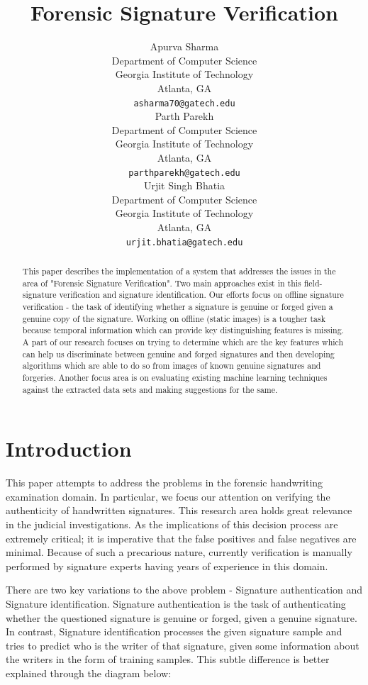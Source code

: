 \documentclass{article}
\title{Forensic Signature Verification}
\author{
Apurva Sharma\\
Department of Computer Science\\
Georgia Institute of Technology\\
Atlanta, GA\\
\texttt{asharma70@gatech.edu} \\
\And
Parth Parekh\\
Department of Computer Science\\
Georgia Institute of Technology\\
Atlanta, GA\\
\texttt{parthparekh@gatech.edu} \\
\And
Urjit Singh Bhatia\\
Department of Computer Science\\
Georgia Institute of Technology\\
Atlanta, GA\\
\texttt{urjit.bhatia@gatech.edu} \\
}
\begin{document}
\maketitle

\begin{abstract}
This paper describes the implementation of a system that addresses the issues in the area of "Forensic Signature Verification". Two main approaches exist in this field- signature verification and signature identification. Our efforts focus on offline signature verification - the task of identifying whether a signature is genuine or forged given a genuine copy of the signature. Working on offline (static images) is a tougher task because temporal information which can provide key distinguishing features is missing. A part of our research focuses on trying to determine which are the key features which can help us discriminate between genuine and forged signatures and then developing algorithms which are able to do so from images of known genuine signatures and forgeries. Another focus area is on evaluating existing machine learning techniques against the extracted data sets and making suggestions for the same.

\end{abstract}

\section{Introduction}

This paper attempts to address the problems in the forensic handwriting examination domain. In particular, we focus our attention on verifying the authenticity of handwritten signatures. This research area holds great relevance in the judicial investigations. As the implications of this decision process are extremely critical; it is imperative that the false positives and false negatives are minimal. Because of such a precarious nature, currently verification is manually performed by signature experts having years of experience in this domain.

There are two key variations to the above problem - Signature authentication and Signature identification. Signature authentication is the task of authenticating whether the questioned signature is genuine or forged, given a genuine signature. In contrast, Signature identification processes the given signature sample and tries to predict who is the writer of that signature, given some information about the writers in the form of training samples. This subtle difference is better explained through the diagram below:
\end{document}
